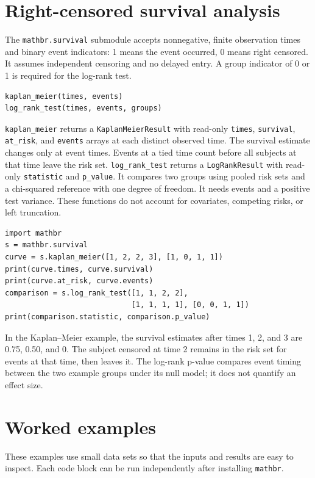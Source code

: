 \documentclass[11pt,a4paper]{article}
\begin{document}
\section{Right-censored survival analysis}
The \verb|mathbr.survival| submodule accepts nonnegative, finite observation times and binary event indicators: 1 means the event occurred, 0 means right censored. It assumes independent censoring and no delayed entry. A group indicator of 0 or 1 is required for the log-rank test.
\begin{verbatim}
kaplan_meier(times, events)
log_rank_test(times, events, groups)
\end{verbatim}
\verb|kaplan_meier| returns a \verb|KaplanMeierResult| with read-only \verb|times|, \verb|survival|, \verb|at_risk|, and \verb|events| arrays at each distinct observed time. The survival estimate changes only at event times. Events at a tied time count before all subjects at that time leave the risk set. \verb|log_rank_test| returns a \verb|LogRankResult| with read-only \verb|statistic| and \verb|p_value|. It compares two groups using pooled risk sets and a chi-squared reference with one degree of freedom. It needs events and a positive test variance. These functions do not account for covariates, competing risks, or left truncation.
\begin{verbatim}
import mathbr
s = mathbr.survival
curve = s.kaplan_meier([1, 2, 2, 3], [1, 0, 1, 1])
print(curve.times, curve.survival)
print(curve.at_risk, curve.events)
comparison = s.log_rank_test([1, 1, 2, 2],
                             [1, 1, 1, 1], [0, 0, 1, 1])
print(comparison.statistic, comparison.p_value)
\end{verbatim}
In the Kaplan--Meier example, the survival estimates after times 1, 2, and 3 are 0.75, 0.50, and 0. The subject censored at time 2 remains in the risk set for events at that time, then leaves it. The log-rank p-value compares event timing between the two example groups under its null model; it does not quantify an effect size.

\section{Worked examples}
These examples use small data sets so that the inputs and results are easy to inspect. Each code block can be run independently after installing \texttt{mathbr}.
\end{document}

